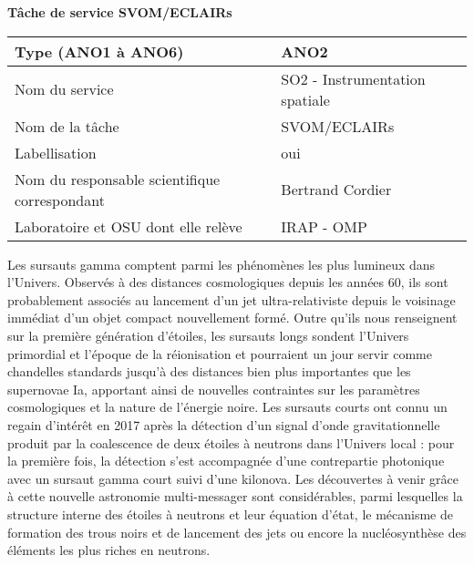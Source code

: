 \documentclass[11pt,onecolumn]{article}
\title{	
\vspace*{-2.5cm}
}
\author{\tiny} %
\date{\tiny }%
\begin{document}


\renewcommand{\headrulewidth}{1pt}
\pagestyle{fancy}
\fancyhf{}
\rfoot{\thepage / \pageref{LastPage}}

\begin{center}
\Large \textbf{Tâche de service SVOM/ECLAIRs}
\end{center}
\normalfont
\vspace*{-0.4cm}
\begin{table}[h!]
\centering
\label{my-label}
\begin{tabular}{|l|l|}
\hline
Type (ANO1 \`{a} ANO6) & ANO2 \\ \hline
Nom du service & SO2 - Instrumentation spatiale \\ \hline
Nom de la t\^{a}che & SVOM/ECLAIRs \\ \hline
Labellisation & oui \\ \hline
Nom du responsable scientifique correspondant & Bertrand Cordier \\ \hline
Laboratoire et OSU dont elle rel\`eve & IRAP - OMP \\ \hline
\end{tabular}
\end{table}


Les sursauts gamma comptent parmi les phénomènes les plus lumineux dans l'Univers. Observés à des distances cosmologiques depuis les années 60, ils sont probablement associés au lancement d'un jet ultra-relativiste depuis le voisinage immédiat d'un objet compact nouvellement formé. Outre qu'ils nous renseignent sur la première génération d'étoiles, les sursauts longs sondent l'Univers primordial et l'époque de la réionisation et pourraient un jour servir comme chandelles standards jusqu'à des distances bien plus importantes que les supernovae Ia, apportant ainsi de nouvelles contraintes sur les paramètres cosmologiques et la nature de l'énergie noire. Les sursauts courts ont connu un regain d'intérêt en 2017 après la détection d'un signal d'onde gravitationnelle produit par la coalescence de deux étoiles à neutrons dans l'Univers local : pour la première fois, la détection s'est accompagnée d'une contrepartie photonique avec un sursaut gamma court suivi d'une kilonova. Les découvertes à venir grâce à cette nouvelle astronomie multi-messager sont considérables, parmi lesquelles la structure interne des étoiles à neutrons et leur équation d'état, le mécanisme de formation des trous noirs et de lancement des jets ou encore la nucléosynthèse des éléments les plus riches en neutrons.
\end{document}
